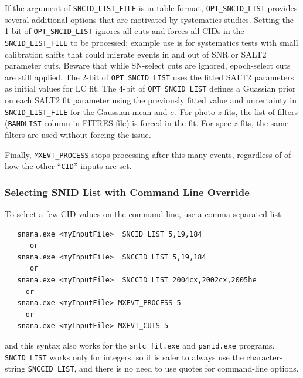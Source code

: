 \documentclass[12pt]{article}
\begin{document}
If the argument of {\tt SNCID\_LIST\_FILE} is in table format,
{\tt OPT\_SNCID\_LIST} provides several additional options that
are motivated by systematics studies.
Setting the 1-bit of {\tt OPT\_SNCID\_LIST} ignores all cuts and
forces all CIDs in the {\tt SNCID\_LIST\_FILE} to be processed;
example use is for systematics tests with small calibration shifts that
could migrate events in and out of SNR or SALT2 parameter cuts.
Beware that while SN-select cuts are ignored,
epoch-select cuts are still applied.
The 2-bit of {\tt OPT\_SNCID\_LIST} uses the fitted
SALT2 parameters as initial values for LC fit.
The 4-bit of {\tt OPT\_SNCID\_LIST} defines a Guassian prior on each
SALT2 fit parameter using the previously fitted value and uncertainty in
{\tt SNCID\_LIST\_FILE} for the Gaussian mean and $\sigma$.
For photo-$z$ fits, the list of filters ({\tt BANDLIST} column in FITRES file)
is forced in the fit. For spec-$z$ fits, the same filters are used without
forcing the issue.


Finally, {\tt MXEVT\_PROCESS} stops processing after this many
events, regardless of of how the other ``{\tt CID}'' inputs are set.

\subsubsection{Selecting SNID List with Command Line Override}

To select a few CID values on the command-line, 
use a comma-separated list:
\begin{verbatim}
   snana.exe <myInputFile>  SNCID_LIST 5,19,184
      or
   snana.exe <myInputFile>  SNCCID_LIST 5,19,184
      or
   snana.exe <myInputFile>  SNCCID_LIST 2004cx,2002cx,2005he
     or
   snana.exe <myInputFile> MXEVT_PROCESS 5
     or
   snana.exe <myInputFile> MXEVT_CUTS 5
\end{verbatim} 
%
and this syntax also works for the {\tt snlc\_fit.exe} and {\tt psnid.exe}
programs. {\tt SNCID\_LIST} works only for integers, so it is safer
to always use the character-string {\tt SNCCID\_LIST}, 
and there is no need to use quotes for command-line options.


\end{document}
